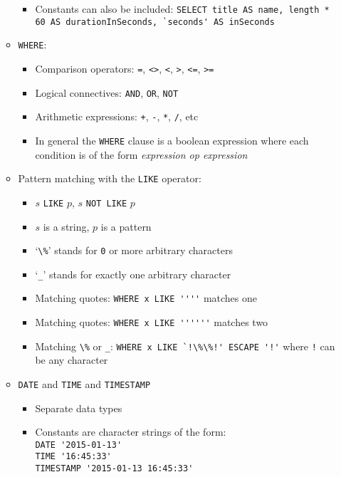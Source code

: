 \documentclass[landscape,8pt]{extarticle}
\newcommand{\code}{\lstinline}
\begin{document}
\begin{multicols}{4}
\begin{itemize}
\begin{itemize}
\begin{itemize}
        \item Constants can also be included: \code{SELECT title AS name, length * 60 AS durationInSeconds, `seconds' AS inSeconds}
    \end{itemize}
        \item \code{WHERE}:
        \begin{itemize}
            \item Comparison operators: \code{=}, \code{<>}, \code{<}, \code{>}, \code{<=}, \code{>=}
            \item Logical connectives: \code{AND}, \code{OR}, \code{NOT}
            \item Arithmetic expressions: \code{+}, \code{-}, \code{*}, \code{/}, etc
            \item In general the \code{WHERE} clause is a boolean expression where each condition is
            of the form \emph{expression op expression}
        \end{itemize}
        \item Pattern matching with the \code{LIKE} operator:
        \begin{itemize}
            \item $s$ \code{LIKE} $p$, $s$ \code{NOT LIKE} $p$
            \item $s$ is a string, $p$ is a pattern
            \item `\code{\%}' stands for \code{0} or more arbitrary characters
            \item `\code{_}' stands for exactly one arbitrary character
            \item Matching quotes: \code{WHERE x LIKE ''''} matches one 
            \item Matching quotes: \code{WHERE x LIKE ''''''} matches two 
            \item Matching \code{\%} or \code{_}: \code{WHERE x LIKE `!\%\%!' ESCAPE '!'} where
            \code{!} can be any character
        \end{itemize}
        \item \code{DATE} and \code{TIME} and \code{TIMESTAMP}
        \begin{itemize}
            \item Separate data types
            \item Constants are character strings of the form: \\
\code{DATE '2015-01-13'} \\
\code{TIME '16:45:33'} \\
\code{TIMESTAMP '2015-01-13 16:45:33'} 

\end{itemize}
\end{itemize}
\end{itemize}
\end{multicols}
\end{document}
